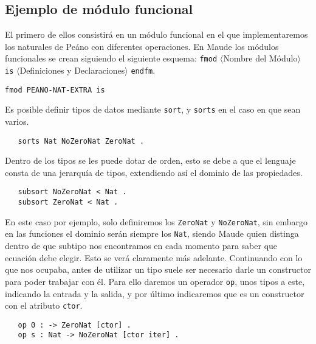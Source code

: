 \subsection{Ejemplo de módulo funcional}

El primero de ellos consistirá en un módulo funcional en el que implementaremos los naturales de Peáno con diferentes operaciones. En Maude los módulos funcionales se crean siguiendo el siguiente esquema: \texttt{fmod} $\langle$Nombre del Módulo$\rangle$ \texttt{is} $\langle$Definiciones y Declaraciones$\rangle$ \texttt{endfm}.\par

{\codesize
\begin{verbatim}
fmod PEANO-NAT-EXTRA is
\end{verbatim}
}

Es posible definir tipos de datos mediante \texttt{sort}, y \texttt{sorts} en el caso en que sean varios. \par

{\codesize
\begin{verbatim}
   sorts Nat NoZeroNat ZeroNat .
\end{verbatim}
}

Dentro de los tipos se les puede dotar de orden, esto se debe a que el lenguaje consta de una jerarquía de tipos, extendiendo así el dominio de las propiedades. \par

{\codesize
\begin{verbatim}
   subsort NoZeroNat < Nat .
   subsort ZeroNat < Nat .
\end{verbatim}
}

En este caso por ejemplo, solo definiremos los \texttt{ZeroNat} y \texttt{NoZeroNat}, sin embargo en las funciones el dominio serán siempre los \texttt{Nat}, siendo Maude quien distinga dentro de que subtipo nos encontramos en cada momento para saber que ecuación debe elegir. Esto se verá claramente más adelante. Continuando con lo que nos ocupaba, antes de utilizar un tipo suele ser necesario darle un constructor para poder trabajar con él. Para ello daremos un operador \texttt{op}, unos tipos a este, indicando la entrada y la salida, y por último indicaremos que es un constructor con el atributo \texttt{ctor}. \par

{\codesize
\begin{verbatim}
   op 0 : -> ZeroNat [ctor] .
   op s : Nat -> NoZeroNat [ctor iter] .
\end{verbatim}
}

